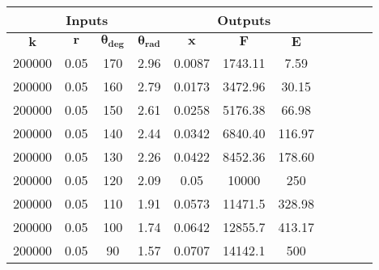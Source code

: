 \begin{tabular}{| c | c | c | c || c | c | c | c | c | c | c |}
	\hline
	\multicolumn{4}{|c||}{\bf Inputs} & \multicolumn{3}{|c|}{\bf Outputs} \\ \hline	
	$\mathbf{k}$       & $\mathbf{r}$     & $\mathbf{\theta_{deg}}$ & $\mathbf{\theta_{rad}}$ & $\mathbf{x}$       & $\mathbf{F}$       & $\mathbf{E}$       \\ \hline %
	200000  & 0.05  & 170            & 2.96           & 0.0087  & 1743.11 & 7.59    \\ \hline %
	200000  & 0.05  & 160            & 2.79           & 0.0173  & 3472.96 & 30.15   \\ \hline %
	200000  & 0.05  & 150            & 2.61           & 0.0258  & 5176.38 & 66.98   \\ \hline %
	200000  & 0.05  & 140            & 2.44           & 0.0342  & 6840.40 & 116.97  \\ \hline %
	200000  & 0.05  & 130            & 2.26           & 0.0422  & 8452.36 & 178.60  \\ \hline %
	200000  & 0.05  & 120            & 2.09           & 0.05    & 10000   & 250     \\ \hline %
	200000  & 0.05  & 110            & 1.91           & 0.0573  & 11471.5 & 328.98  \\ \hline %
	200000  & 0.05  & 100            & 1.74           & 0.0642  & 12855.7 & 413.17  \\ \hline %
	200000  & 0.05  & 90             & 1.57           & 0.0707  & 14142.1 & 500     \\ \hline %

\end{tabular}

